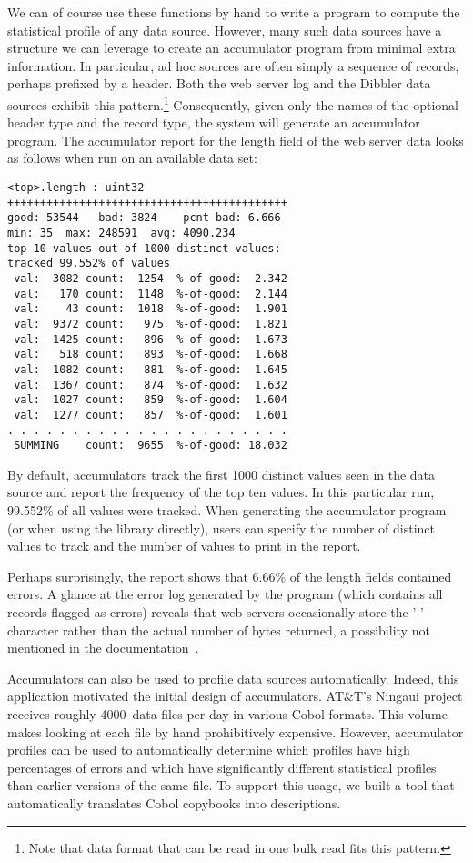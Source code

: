 \documentclass{sig-alternate}
\begin{document}
We can of course use these functions by hand to write
a program to compute the statistical profile of any \pads{} data source.
However, many such data sources have a structure we can leverage
to create an accumulator program from minimal extra information.  In particular,
ad hoc sources are often simply a sequence of records, perhaps prefixed by a header. Both the web server log and the Dibbler data sources exhibit this pattern.\footnote{
  Note that data format that can be read in one bulk read fits this pattern.
} 
Consequently, given only the names of the optional
header type and the record type, the \pads{} system will generate 
an accumulator program.  The accumulator report for the length field
of the web server data looks as follows when run on an available data set:

\begin{verbatim}
<top>.length : uint32
+++++++++++++++++++++++++++++++++++++++++++
good: 53544   bad: 3824    pcnt-bad: 6.666
min: 35  max: 248591  avg: 4090.234
top 10 values out of 1000 distinct values:
tracked 99.552% of values
 val:  3082 count:  1254  %-of-good:  2.342
 val:   170 count:  1148  %-of-good:  2.144
 val:    43 count:  1018  %-of-good:  1.901
 val:  9372 count:   975  %-of-good:  1.821
 val:  1425 count:   896  %-of-good:  1.673
 val:   518 count:   893  %-of-good:  1.668
 val:  1082 count:   881  %-of-good:  1.645
 val:  1367 count:   874  %-of-good:  1.632
 val:  1027 count:   859  %-of-good:  1.604
 val:  1277 count:   857  %-of-good:  1.601
. . . . . . . . . . . . . . . . . . . . . . 
 SUMMING    count:  9655  %-of-good: 18.032
\end{verbatim}
%
By default, accumulators track the first 1000 distinct
values seen in the data source and report the frequency
of the top ten values.  In this particular run, 99.552\%
of all values were tracked.  When generating the accumulator
program (or when using the library directly), \pads{} users can specify 
the number of distinct values to track and the number 
of values to print in the report.

Perhaps surprisingly, the report shows that 6.66\% of the length
fields contained errors.  A glance at the error log generated
by the program (which contains all records flagged as errors) 
reveals that web servers occasionally store the '-' character
rather than the actual number of bytes returned, a possibility
not mentioned in the documentation~\cite{wpp}.

Accumulators can also be used to profile data sources automatically.
Indeed, this application motivated the initial design of accumulators.
AT\&T's Ningaui project receives roughly 4000~data files per day in various
Cobol formats.  This volume makes looking at each file by hand 
prohibitively expensive.  However, accumulator profiles can be used to 
automatically determine
which profiles have high percentages of errors and which have significantly
different statistical profiles than earlier versions of the same file.  
To support this usage, we built a tool that automatically translates
Cobol copybooks into \pads{} descriptions.
\end{document}
